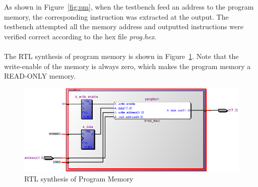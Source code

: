 As shown in Figure~\ref{fig:pm}, when the testbench feed an address to the program memory, the corresponding instruction was extracted at the output. The testbench attempted all the memory address and outputted instructions were verified correct according to the hex file \textit{prog.hex}. \\\\
The RTL synthesis of program memory is shown in Figure~\ref{fig:memory}. Note that the write-enable of the memory is always zero, which makes the program memory a READ-ONLY memory.
		\begin{figure}[H]
		\centering
		\includegraphics[width = \textwidth]{Figures/progmem}		
		\caption{RTL synthesis of Program Memory}
		\label {fig:memory}
	\end{figure}

